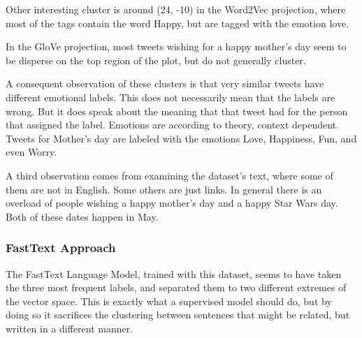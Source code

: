 Other interesting cluster is around (24, -10) in the Word2Vec projection, where most of the tags contain the word Happy, but are tagged with the emotion love.

In the GloVe projection, most tweets wishing for a happy mother's day seem to be disperse on the top region of the plot, but do not generally cluster.

A consequent observation of these clusters is that very similar tweets have different emotional labels. This does not necessarily mean that the labels are wrong. But it does speak about the meaning that that tweet had for the person that assigned the label. Emotions are according to theory, context dependent. Tweets for Mother's day are labeled with the emotions Love, Happiness, Fun, and even Worry.

A third observation comes from examining the dataset's text, where some of them are not in English. Some others are just links. In general there is an overload of people wishing a happy mother's day and a happy Star Wars day. Both of these dates happen in May.

\subsubsection{FastText Approach}
The FastText Language Model, trained with this dataset, seems to have taken the three most frequent labels, and separated them to two different extremes of the vector space. This is exactly what a supervised model should do, but by doing so it sacrifices the clustering between sentences that might be related, but written in a different manner.
